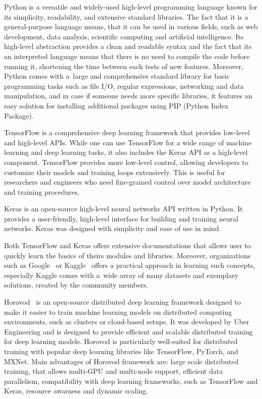 Python is a versatile and widely-used high-level programming language known
for its simplicity, readability, and extensive standard libraries. The fact
that it is a general-purpose language means, that it can be used in various
fields, such as web development, data analysis, scientific computing and
artificial intelligence. Its high-level abstraction provides a clean and
readable syntax and the fact that its an interpreted language means that
there is no need to compile the code before running it, shortening the
time between each tests of new features. Moreover, Python comes with a~large
and comprehensive standard library for basic programming tasks such as file I/O,
regular expressions, networking and data manipulation, and in case if someone
needs more specific libraries, it features an easy solution for installing
additional packages using PIP (Python Index Package).

TensorFlow is a comprehensive deep learning framework that provides low-level
and high-level APIs. While one can use TensorFlow for a wide range of machine
learning and deep learning tasks, it also includes the Keras API as a high-level
component. TensorFlow provides more low-level control, allowing developers to
customize their models and training loops extensively. This is useful for
researchers and engineers who need fine-grained control over model architecture
and training procedures.

Keras is an open-source high-level neural networks API written in Python.
It provides a user-friendly, high-level interface for building and training
neural networks. Keras was designed with simplicity and ease of use in mind.

Both TensorFlow and Keras offers extensive documentations that allows user
to quickly learn the basics of theirs modules and libraries. Moreover,
organizations such as Google~\cite{Google_Machine_Learning_Crash_Course}
or Kaggle~\cite{Kaggle} offers a practical approach in learning such concepts,
especially Kaggle comes with a~wide array of many datasets and exemplary
solutions, created by the community members.

Horovod~\cite{Horovod} is an open-source distributed deep learning framework
designed to make it easier to train machine learning models on distributed
computing environments, such as clusters or cloud-based setups. It was
developed by Uber Engineering and is designed to provide efficient and
scalable distributed training for deep learning models. Horovod is
particularly well-suited for distributed training with popular deep learning
libraries like TensorFlow, PyTorch, and MXNet. Main advantages of Horovod
framework are: large scale distributed training, that allows multi-GPU and
multi-node support, efficient data parallelism, compatibility with deep
learning frameworks, such as TensorFlow and Keras, resource awarness and
dynamic scaling.

